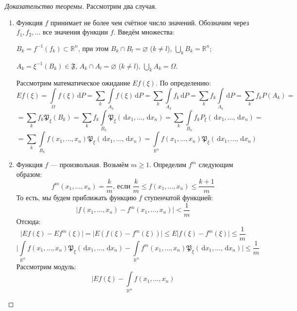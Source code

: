 \documentclass[11pt,openany,a4paper]{scrartcl}
\theoremstyle{plain}
\theoremstyle{definition}
\newcommand\mb{\mathbb}
\newcommand\real{\mb R}
\newcommand{\dif}{\, \mathrm d}
\begin{document}
\begin{proof}[Доказательство теоремы]
    Рассмотрим два случая.
    \begin{enumerate}
        \item Функция $f$ принимает не более чем счётное число значений. Обозначим
        через $f_1, f_2, \ldots$ все значения функции $f$. Введём множества:
        
        $B_k = f^{-1}(f_k) \subset \real^n$, при этом $B_k \cap B_l = \varnothing$
        ($k \neq l$), $\bigcup\limits_k B_k = \real^n$;
        
        $A_k = \xi^{-1}(B_k) \in \mathfrak F$, $A_k \cap A_l = \varnothing$
        ($k \neq l$), $\bigcup\limits_k A_k = \Omega$.
        
        Рассмотрим математическое ожидание $Ef(\xi)$. По определению:
        $$
        Ef(\xi) = \int\limits_\Omega f(\xi) \dif P =
        \sum\limits_k \int\limits_{A_k} f(\xi) \dif P =
        \sum\limits_k \int\limits_{A_k} f_k \dif P =
        \sum\limits_k f_k \int\limits_{A_k} \dif P = \sum\limits_k f_k P(A_k) =
        $$
        $$
        = \sum\limits_k f_k \mathfrak P_\xi (B_k) =
        \sum\limits_k f_k \int\limits_{B_k}
        \mathfrak P_\xi (\dif x_1, \ldots, \dif x_n) =
        \sum\limits_k \int\limits_{B_k} f_k P_\xi (\dif x_1, \ldots, \dif x_n) =
        $$
        $$
        = \sum\limits_k \int\limits_{B_k} f(x_1, \ldots, x_n)
        \mathfrak P_\xi (\dif x_1, \ldots, \dif x_n) =
        \int\limits_{\real^n} f(x_1, \ldots, x_n)
        \mathfrak P_\xi (\dif x_1, \ldots, \dif x_n)
        $$
        \item Функция $f$ — произвольная.
        Возьмём $m \geqslant 1$. Определим $f^m$ следующим образом:
        $$
        f^m(x_1, \ldots, x_n) = \frac{k}{m} \text{, если }
        \frac{k}{m} \leqslant f(x_1, \ldots, x_n) \leqslant \frac{k+1}{m}
        $$
        То есть, мы будем приближать функцию $f$ ступенчатой функцией:
        $$
        \big|f(x_1, \ldots, x_n) - f^m(x_1, \ldots, x_n)\big| < \frac{1}{m}
        $$
        Отсюда:
        $$
        \big|Ef(\xi) - Ef^m(\xi)\big| = \big|E(f(\xi) - f^m(\xi))\big| \leqslant
        E\big|f(\xi) - f^m(\xi)\big| \leqslant \frac{1}{m}
        $$
        $$
        \big|\int\limits_{\real^n} f(x_1, \ldots, x_n)
        \mathfrak P_\xi(\dif x_1, \ldots, \dif x_n) -
        \int\limits_{\real^n} f^m(x_1, \ldots, x_n)
        \mathfrak P_\xi(\dif x_1, \ldots, \dif x_n)\big| \leqslant \frac{1}{m}
        $$
        Рассмотрим модуль:
        $$
        \big| Ef(\xi) - \int\limits_{\real^n} f(x_1, \ldots, x_n)
$$
\end{enumerate}
\end{proof}
\end{document}

